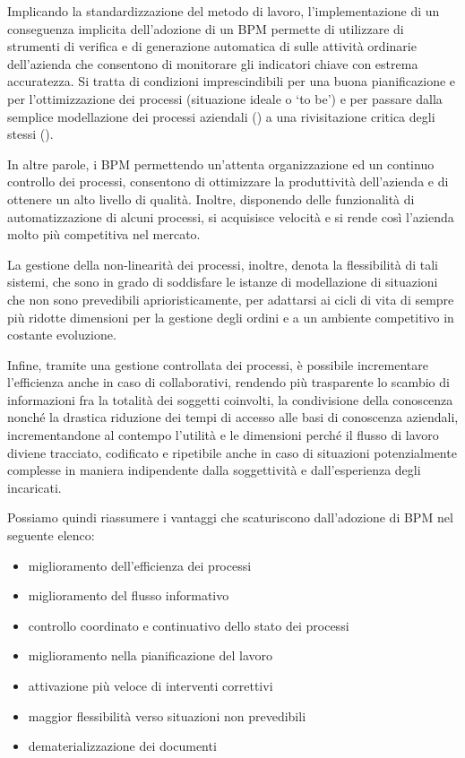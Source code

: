 Implicando la standardizzazione del metodo di lavoro, l'implementazione di un  conseguenza implicita dell'adozione di un BPM permette di utilizzare di strumenti di verifica e di generazione automatica di  sulle attività ordinarie dell'azienda che consentono di monitorare gli indicatori chiave con estrema accuratezza. Si tratta di condizioni imprescindibili per una buona pianificazione e per l'ottimizzazione dei processi (situazione ideale o `to be') e per passare dalla semplice modellazione dei processi aziendali (\bsn {}) a una rivisitazione critica degli stessi (\bsn {}).

In altre parole, i \sw BPM permettendo un'attenta organizzazione ed un continuo controllo dei processi, consentono di ottimizzare la produttività dell'azienda e di ottenere un alto livello di qualità. Inoltre, disponendo delle funzionalità di automatizzazione di alcuni processi, si acquisisce velocità e si rende così l'azienda molto più competitiva nel mercato.

La gestione della non-linearità dei processi, inoltre, denota la flessibilità di tali sistemi, che sono in grado di soddisfare le istanze di modellazione di situazioni che non sono prevedibili aprioristicamente, per adattarsi ai cicli di vita di sempre più ridotte dimensioni per la gestione degli ordini e a un ambiente competitivo in costante evoluzione.

Infine, tramite una gestione controllata dei processi, è possibile incrementare l'efficienza anche in caso di  collaborativi, rendendo più trasparente lo scambio di informazioni fra la totalità dei soggetti coinvolti, la condivisione della conoscenza nonché la drastica riduzione dei tempi di accesso alle basi di conoscenza aziendali, incrementandone al contempo l'utilità e le dimensioni perché il flusso di lavoro diviene tracciato, codificato e ripetibile anche in caso di situazioni potenzialmente complesse in maniera indipendente dalla soggettività e dall'esperienza degli incaricati.

Possiamo quindi riassumere i vantaggi che scaturiscono dall'adozione di \sw BPM nel seguente elenco:

\begin{itemize}
	\item miglioramento dell'efficienza dei processi
	\item miglioramento del flusso informativo
	\item controllo coordinato e continuativo dello stato dei processi
	\item miglioramento nella pianificazione del lavoro
	\item attivazione più veloce di interventi correttivi
	\item maggior flessibilità verso situazioni non prevedibili
	\item dematerializzazione dei documenti 	
\end{itemize}
	
